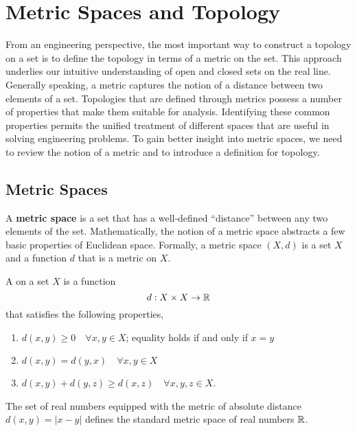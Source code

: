 \chapter{Metric Spaces and Topology}

From an engineering perspective, the most important way to construct a topology on a set is to define the topology in terms of a metric on the set.
This approach underlies our intuitive understanding of open and closed sets on the real line.
Generally speaking, a metric captures the notion of a distance between two elements of a set.
Topologies that are defined through metrics possess a number of properties that make them suitable for analysis.
Identifying these common properties permits the unified treatment of different spaces that are useful in solving engineering problems.
To gain better insight into metric spaces, we need to review the notion of a metric and to introduce a definition for topology.


\section{Metric Spaces}

A \textbf{metric space} is a set that has a well-defined ``distance'' between any two elements of the set.
Mathematically, the notion of a metric space abstracts a few basic properties of Euclidean space.
Formally, a metric space $(X,d)$ is a set $X$ and a function $d$ that is a metric on $X$.
\begin{definition}
A  on a set $X$ is a function
\begin{equation*}
d: X \times X \rightarrow \mathbb{R}
\end{equation*}
that satisfies the following properties,
\begin{enumerate}
\item $d(x,y) \geq 0 \quad \forall x, y \in X$; equality holds if and only if $x = y$
\item $d(x,y) = d(y,x) \quad \forall x, y \in X$
\item $d(x,y) + d(y,z) \geq d(x,z) \quad \forall x, y, z \in X$.
\end{enumerate}
\end{definition}

\begin{example}
The set of real numbers equipped with the metric of absolute distance $d(x,y)=\left| x-y \right|$ defines the standard metric space of real numbers $\mathbb{R}$.
\end{example}


